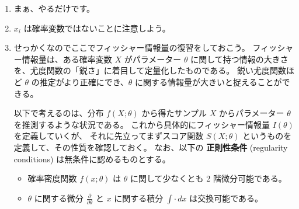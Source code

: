 \documentclass[./main.tex]{subfiles}
\begin{document}
    \begin{enumerate}
        \item まぁ、やるだけです。
        \item $x_i$ は確率変数ではないことに注意しよう。
        
        \item せっかくなのでここでフィッシャー情報量の復習をしておこう。
        フィッシャー情報量は、ある確率変数 $X$ がパラメーター $\theta$ に関して持つ情報の大きさを、尤度関数の「鋭さ」に着目して定量化したものである。
        鋭い尤度関数ほど $\theta$ の推定がより正確にでき、$\theta$ に関する情報量が大きいと捉えることができる。

        
        以下で考えるのは、分布 $f(X; \theta)$ から得たサンプル $X$ からパラメーター $\theta$ を推測するような状況である。
        これから具体的にフィッシャー情報量 $I (\theta)$ を定義していくが、
        それに先立ってまずスコア関数 $S (X; \theta)$ というものを定義して、その性質を確認しておく。
        なお、以下の \textbf{正則性条件} (regularity conditions) は無条件に認めるものとする。
        \begin{itemize}
            \item 確率密度関数 $f(x; \theta)$ は $\theta$ に関して少なくとも 2 階微分可能である。
            \item $\theta$ に関する微分 $\frac{\partial}{\partial \theta}$ と $x$ に関する積分 $\int \cdot \, dx $ は交換可能である。
        \end{itemize}


\end{enumerate}
\end{document}
